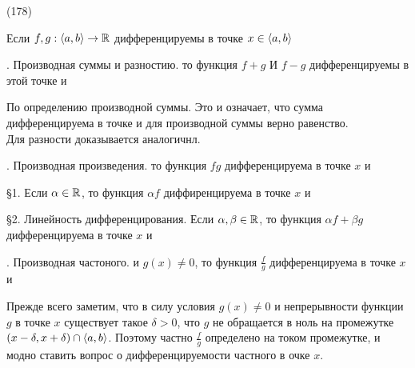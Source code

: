 (178)

Если $f, g: \langle a, b \rangle \to \mathbb{R}$ дифференцируемы в точке $x \in \langle a, b \rangle$

. \q Производная суммы и разностию. то функция $f + g$ И $f - g$ дифференцируемы в этой точке и 

\D По определению производной суммы.  Это и означает, что сумма дифференцируема в точке и для производной суммы верно равенство.\\
Для разности доказывается аналогичнл.

. \q Производная произведения. то функция $fg$ дифференцируема в точке $x$ и 

\D {}

\S1. Если $\alpha \in \mathbb{R}$, то функция $\alpha f$ диффиренцируема в точке $x$ и 

\S2. \q Линейность дифференцирования. Если $\alpha, \beta \in \mathbb{R}$, то функция $\alpha f + \beta g$ дифференцируема в точке $x$ и 

. \q Производная частоного. и $g(x) \neq 0$, то функция $\frac fg$ дифференцируема в точке $x$ и 

\D Прежде всего заметим, что в силу условия $g(x) \neq 0$ и непрерывности функции $g$ в точке $x$ существует такое $\delta > 0$, что $g$ не обращается в ноль на промежутке $(x - \delta, x + \delta)\cap\langle a, b \rangle$. Поэтому частно $\frac fg$ определено на током промежутке, и модно ставить вопрос о дифференцируемости частного в очке $x$.
